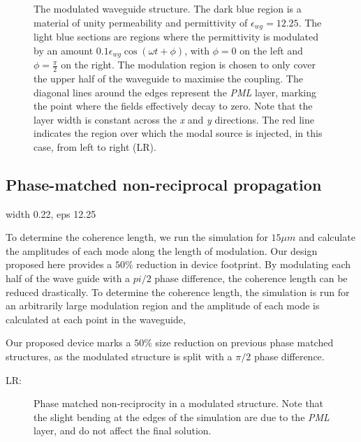 \begin{figure}[t]
\centering
\setlength{\figH}{1\textwidth}
\setlength{\figW}{1\textwidth}

\caption[The modulated waveguide structure]{The modulated waveguide structure. The dark blue region is a material of unity permeability and permittivity of $\epsilon_{wg} = 12.25$. The light blue sections are regions where the permittivity is modulated by an amount $0.1 \epsilon_{wg} \cos(\omega t + \phi)$, with $\phi=0$ on the left and $\phi=\frac{\pi}{2}$ on the right. The modulation region is chosen to only cover the upper half of the waveguide to maximise the coupling. The diagonal lines around the edges represent the \textit{PML} layer, marking the point where the fields effectively decay to zero. Note that the layer width is constant across the \textit{x} and \textit{y} directions. The red line indicates the region over which the modal source is injected, in this case, from left to right (LR).}
\label{fig:cavity}
\end{figure} 

\subsection{Phase-matched non-reciprocal propagation}
width 0.22, eps 12.25

\begin{figure}[t]
	\centering
	\setlength{\figH}{0.4\textwidth}
	\setlength{\figW}{0.7\textwidth}
	
	\caption[]{}
	\label{fig:bandyu}
\end{figure} 

To determine the coherence length, we run the simulation for $15 \mu m$ and calculate the amplitudes of each mode along the length of modulation. Our design proposed here provides a $50 \%$ reduction in device footprint. By modulating each half of the wave guide with a $pi/2$ phase difference, the coherence length can be reduced drastically. To determine the coherence length, the simulation is run for an arbitrarily large modulation region and the amplitude of each mode is calculated at each point in the waveguide,

Our proposed device marks a $50 \%$ size reduction on previous phase matched structures, as the modulated structure is split with a $\pi/2$ phase difference.

LR:
\begin{figure}[t]
	\centering
	\setlength{\figH}{0.4\textwidth}
	\setlength{\figW}{0.8\textwidth}
	\begin{subfigure}[t]{0.5\textwidth}
	
	\end{subfigure}%
	\begin{subfigure}[t]{0.5\textwidth}
	
	\end{subfigure}
	\caption[]{Phase matched non-reciprocity in a modulated structure. Note that the slight bending at the edges of the simulation are due to the \textit{PML} layer, and do not affect the final solution.}
	\label{fig:bandyu}
\end{figure} 



